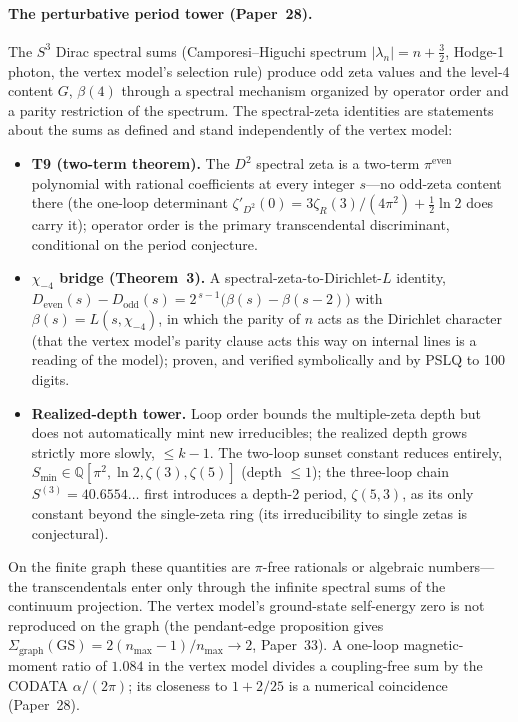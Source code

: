 \documentclass[aps,pra,twocolumn,superscriptaddress,longbibliography]{revtex4-2}
\begin{document}
\paragraph{The perturbative period tower (Paper~28).}
The $S^3$ Dirac spectral sums (Camporesi--Higuchi spectrum
$|\lambda_n|=n+\tfrac32$, Hodge-1 photon, the vertex model's selection
rule) produce odd zeta values and the level-4 content $G$,
$\beta(4)$ through a spectral mechanism organized by operator order and
a parity restriction of the spectrum.  The spectral-zeta identities are statements about the
sums as defined and stand independently of the vertex model:
\begin{itemize}
\item \textbf{T9 (two-term theorem).}  The $D^2$ spectral zeta is a
two-term $\pi^{\text{even}}$ polynomial with rational coefficients at
every integer $s$---no odd-zeta content there (the one-loop determinant
$\zeta'_{D^2}(0) = 3\zeta_R(3)/(4\pi^2) + \tfrac12\ln 2$ does carry it); operator order is the primary
transcendental discriminant, conditional on the period conjecture.
\item \textbf{$\chi_{-4}$ bridge (Theorem~3).}  A spectral-zeta-to-Dirichlet-$L$
identity, $D_{\text{even}}(s)-D_{\text{odd}}(s)=2^{\,s-1}\bigl(\beta(s)-\beta(s-2)\bigr)$
with $\beta(s)=L(s,\chi_{-4})$, in which the parity of $n$ acts as the
Dirichlet character (that the vertex model's parity clause acts this way
on internal lines is a reading of the model); proven, and verified
symbolically and by PSLQ to 100 digits.
\item \textbf{Realized-depth tower.}  Loop order bounds the multiple-zeta
depth but does not automatically mint new irreducibles; the realized
depth grows strictly more slowly, $\le k-1$.  The two-loop sunset
constant reduces entirely,
$S_{\min}\in\mathbb{Q}[\pi^2,\ln2,\zeta(3),\zeta(5)]$ (depth $\le1$);
the three-loop chain $S^{(3)}=40.6554\ldots$ first introduces a depth-2
period, $\zeta(5,3)$, as its only constant beyond the single-zeta ring
(its irreducibility to single zetas is conjectural).
\end{itemize}
On the finite graph these quantities are $\pi$-free rationals or
algebraic numbers---the transcendentals enter only through the infinite
spectral sums of the continuum projection.  The vertex model's
ground-state self-energy zero is not reproduced on the graph (the
pendant-edge proposition gives
$\Sigma_{\text{graph}}(\text{GS})=2(n_{\max}-1)/n_{\max}\to2$, Paper~33).
A one-loop magnetic-moment ratio of $1.084$ in the vertex model divides a
coupling-free sum by the CODATA $\alpha/(2\pi)$; its closeness to
$1 + 2/25$ is a numerical coincidence (Paper~28).
\end{document}
